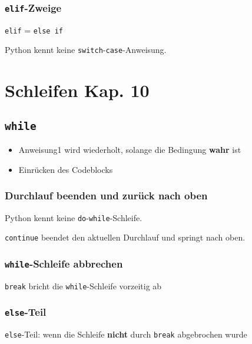 \subsubsection{\texttt{elif}-Zweige}

\texttt{elif} = \texttt{else if}\\

\begin{achtung}
	Python kennt keine \texttt{switch}-\texttt{case}-Anweisung.
\end{achtung}

\section[Schleifen]{Schleifen \tiny{Kap. 10}}
\subsection{\texttt{while}}

\begin{itemize}
	\item Anweisung1 wird wiederholt, solange die Bedingung \textbf{wahr} ist
	\item Einrücken des Codeblocks
\end{itemize}

\subsubsection{Durchlauf beenden und zurück nach oben}
\begin{achtung}
	Python kennt keine \texttt{do}-\texttt{while}-Schleife.
\end{achtung}


\texttt{continue} beendet den aktuellen Durchlauf und springt nach oben.

\subsubsection{\texttt{while}-Schleife abbrechen}

\texttt{break} bricht die \texttt{while}-Schleife vorzeitig ab

\subsubsection{\texttt{else}-Teil}

\texttt{else}-Teil: wenn die Schleife \textbf{nicht} durch \texttt{break} abgebrochen wurde

